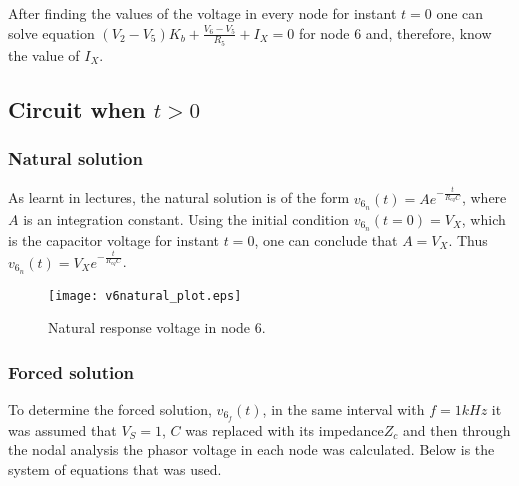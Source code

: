 After finding the values of the voltage in every node for instant $t=0$ one can solve equation $(V_2-V_5)K_b + \frac{V_6-V_5}{R_5} + I_X = 0$ for node 6 and, therefore, know the value of $I_X$.





\subsection{Circuit when $t>0$}

\subsubsection{Natural solution}  %
As learnt in lectures, the natural solution is of the form $v_{6_{n}}(t) = A e^{-\frac{t}{R_{eq}C}}$, where $A$ is an integration constant.
Using the initial condition $v_{6_{n}}(t=0) = V_X$, which is the capacitor voltage for instant $t=0$, one can conclude that $A= V_X$. Thus $v_{6_{n}}(t) = V_X e^{-\frac{t}{R_{eq}C}}$.



\begin{figure}[h] \centering
\texttt{[image: v6natural\_plot.eps]}
\caption{Natural response voltage in node 6.}
\label{fig:natural}
\end{figure}


\subsubsection{Forced solution}  %
To determine the forced solution, $v_{6_{f}}(t)$, in the same interval with $f=1kHz$ it was assumed that $V_S=1$, $C$ was replaced with its impedance$Z_c$ and then through the nodal analysis the phasor voltage in each node was calculated. Below is the system of equations that was used.


